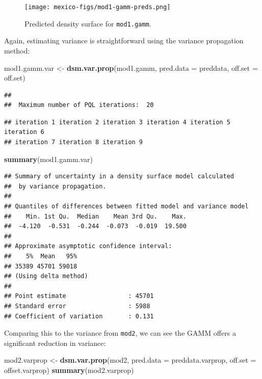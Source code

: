 \documentclass[]{amsart}
\newenvironment{Shaded}{}{}
\newcommand{\KeywordTok}[1]{\textcolor[rgb]{0.00,0.44,0.13}{\textbf{{#1}}}}
\newcommand{\DataTypeTok}[1]{\textcolor[rgb]{0.56,0.13,0.00}{{#1}}}
\newcommand{\StringTok}[1]{\textcolor[rgb]{0.25,0.44,0.63}{{#1}}}
\newcommand{\NormalTok}[1]{{#1}}
\begin{document}
\begin{figure}[htbp]
\centering
\texttt{[image: mexico-figs/mod1-gamm-preds.png]}
\caption{Predicted density surface for \texttt{mod1.gamm}.}
\end{figure}

Again, estimating variance is straightforward using the variance
propagation method:

\begin{Shaded}
\begin{Highlighting}[]
\NormalTok{mod1.gamm.var <-}\StringTok{ }\KeywordTok{dsm.var.prop}\NormalTok{(mod1.gamm, }\DataTypeTok{pred.data =} \NormalTok{preddata, }\DataTypeTok{off.set =} \NormalTok{off.set)}
\end{Highlighting}
\end{Shaded}

\begin{verbatim}
## 
##  Maximum number of PQL iterations:  20
\end{verbatim}

\begin{verbatim}
## iteration 1 iteration 2 iteration 3 iteration 4 iteration 5 iteration 6
## iteration 7 iteration 8 iteration 9
\end{verbatim}

\begin{Shaded}
\begin{Highlighting}[]
\KeywordTok{summary}\NormalTok{(mod1.gamm.var)}
\end{Highlighting}
\end{Shaded}

\begin{verbatim}
## Summary of uncertainty in a density surface model calculated
##  by variance propagation.
## 
## Quantiles of differences between fitted model and variance model
##    Min. 1st Qu.  Median    Mean 3rd Qu.    Max. 
##  -4.120  -0.531  -0.244  -0.073  -0.019  19.500 
## 
## Approximate asymptotic confidence interval:
##    5%  Mean   95% 
## 35389 45701 59018 
## (Using delta method)
## 
## Point estimate                 : 45701 
## Standard error                 : 5988 
## Coefficient of variation       : 0.131
\end{verbatim}

Comparing this to the variance from \texttt{mod2}, we can see the GAMM
offers a significant reduction in variance:

\begin{Shaded}
\begin{Highlighting}[]
\NormalTok{mod2.varprop <-}\StringTok{ }\KeywordTok{dsm.var.prop}\NormalTok{(mod2, }\DataTypeTok{pred.data =} \NormalTok{preddata.varprop, }\DataTypeTok{off.set =} \NormalTok{offset.varprop)}
\KeywordTok{summary}\NormalTok{(mod2.varprop)}
\end{Highlighting}
\end{Shaded}
\end{document}
